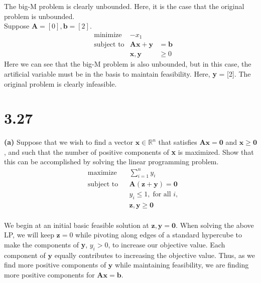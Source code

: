 \documentclass{article}
\begin{document}
The big-M problem is clearly unbounded.  Here, it is the case that the original problem is unbounded.\\

Suppose $\mathbf{A} = [0], \mathbf{b} = [2]$.
\noindent
\begin{equation*}
\begin{aligned}
& \text{minimize} & -x_1 & \\
& \text{subject to} & \mathbf{Ax + y} & = \mathbf{b}  \\
&					& \mathbf{x,y} & \geq 0 
\end{aligned}
\end{equation*}
Here we can see that the big-M problem is also unbounded, but in this case, the artificial variable must be in the basis to maintain feasibility.  Here, \textbf{y} = [2].  The original problem is clearly infeasible.\\

\section*{3.27}
\noindent
\textbf{(a)} Suppose that we wish to find a vector $\mathbf{x} \in \mathbb{R}^n$ that satisfies $\mathbf{Ax = 0}$ and $\mathbf{x \geq 0}$, and such that the number of positive components of \textbf{x} is maximized.  Show that this can be accomplished by solving the linear programming  problem.  \\

\begin{equation*}
\begin{aligned}
& \text{maximize} &&\displaystyle \sum_{i=1}^n y_i \\
& \text{subject to} &&\mathbf{A(z+y)=0} \\
&&&					y_i \leq 1, \; \text{for all } i,\\
&&&					\mathbf{z,y \geq 0}
\end{aligned}
\end{equation*} \\

\noindent
We begin at an initial basic feasible solution at $\mathbf{z,y = 0}$.  When solving the above LP, we will keep $\mathbf{z} = 0$ while pivoting along edges of a standard hypercube to make the components of \textbf{y}, $y_i > 0$, to increase our objective value.  Each component of $\textbf{y}$ equally contributes to increasing the objective value.  Thus, as we find more positive components of $\mathbf{y}$ while maintaining feasibility, we are finding more positive components for $\mathbf{Ax=b}$.
\end{document}
